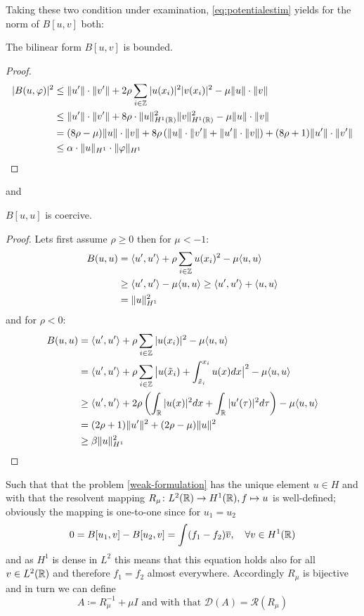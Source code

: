 Taking these two condition under examination, \eqref{eq:potentialestim} yields for the norm of $B[u, v]$ both:
\begin{theorem} \label{1.1}
	The bilinear form $B[u, v]$ is bounded.
	\begin{proof}
		\begin{align*}
			| B(u, \varphi)|^{2} & \leq \| u' \| \cdot \| v' \| + 2 \rho \sum_{i \in \mathbb{Z}} |u(x_{i})|^{2} |v(x_{i})|^{2} - \mu \| u \| \cdot \| v \| \\
				& \leq \| u' \| \cdot \| v' \| + 8 \rho \cdot \| u \|^{2}_{H^{1}(\mathbb{R})} \| v \|^{2}_{H^{1}(\mathbb{R})}  - \mu \| u \| \cdot \| v \| \\
				& = (8\rho - \mu) \| u \| \cdot \| v \| + 8\rho \left( \| u \| \cdot \| v' \| + \| u' \| \cdot \| v \| \right) + (8\rho + 1) \| u' \| \cdot \| v'\| \\
				& \leq \alpha \cdot \| u \|_{H^{1}} \cdot \| \varphi \|_{H^{1}}
		\end{align*}
	\end{proof}
\end{theorem}
and
\begin{theorem} \label{1.2}
	$B[u, u]$ is coercive.
	\begin{proof}
		Lets first assume $\rho \geq 0$ then for $\mu < -1$:
		\begin{align*}
			B(u, u) & = \langle u' , u' \rangle + \rho \sum_{i \in \mathbb{Z}} u(x_{i})^{2} - \mu \langle u , u \rangle \\
					& \geq \langle u' , u' \rangle - \mu \langle u , u \rangle \geq \langle u' , u' \rangle  + \langle u , u \rangle \\
					& = \| u \|_{H^{1}}^{2}
		\end{align*}
		and for $\rho < 0$:
		\begin{align*}
			B(u, u) & = \langle u' , u' \rangle + \rho \sum_{i \in \mathbb{Z}} |u(x_{i})|^{2} - \mu 	\langle u , u \rangle \\
					& = \langle u' , u' \rangle + \rho \sum_{i \in \mathbb{Z}} \big| u(\tilde{x}_{i}) + \int_{\tilde{x}_{i}}^{x_{i}} u(x) dx \big|^{2} - \mu \langle u , u \rangle \\
					& \geq \langle u' , u' \rangle + 2 \rho \left( \int_{\mathbb{R}} |u(x)|^{2} dx + \int_{\mathbb{R}} |u'(\tau)|^{2} d\tau \right) - \mu \langle u , u \rangle \\
					& = (2 \rho + 1) \| u' \|^{2} + (2\rho - \mu) \| u \|^{2}  \\
					& \geq \beta \| u \|_{H^{1}}^{2} 
		\end{align*}
	\end{proof}
\end{theorem}
Such that that the problem \eqref{weak-formulation} has the unique element $u \in H$ and with that the resolvent mapping $R_{\mu} \colon L^{2}(\mathbb{R}) \rightarrow H^{1}(\mathbb{R}), f \mapsto u$ is well-defined; obviously the mapping is one-to-one since for $u_{1} = u_{2}$
	\[ 0 = B[u_{1}, v] - B[u_{2}, v]= \int (f_{1} - f_{2}) \overline{v}, \quad \forall v \in H^{1}(\mathbb{R}) \]
and as $H^{1}$ is dense in $L^{2}$ this means that this equation holds also for all $v \in L^{2}(\mathbb{R})$ and therefore $f_{1} = f_{2}$ almost everywhere. Accordingly $R_{\mu}$ is bijective and in turn we can define 
		\[ A \coloneqq R_{\mu}^{-1} + \mu I \text{ and with that } \mathcal{D}(A) = \mathcal{R}(R_{\mu}) \]